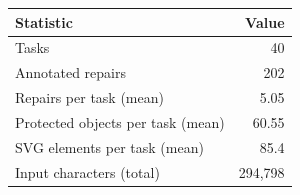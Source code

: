 \begin{tabular}{lr}
\toprule
Statistic & Value \\
\midrule
Tasks & 40 \\
Annotated repairs & 202 \\
Repairs per task (mean) & 5.05 \\
Protected objects per task (mean) & 60.55 \\
SVG elements per task (mean) & 85.4 \\
Input characters (total) & 294,798 \\
\bottomrule
\end{tabular}
